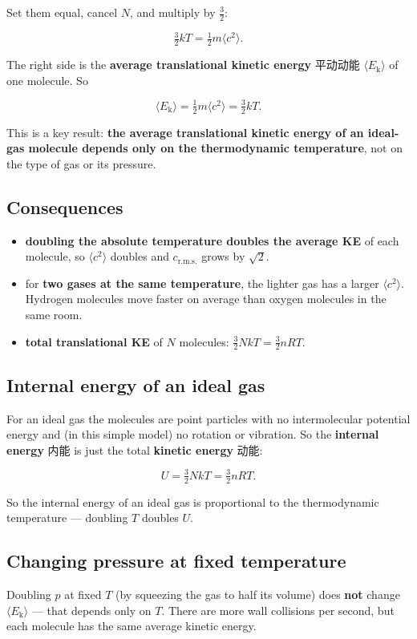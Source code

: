 \documentclass[11pt]{article}
\begin{document}
Set them equal, cancel $N$, and multiply by $\tfrac{3}{2}$:

\[
\tfrac{3}{2} k T = \tfrac{1}{2} m \langle c^{2} \rangle.
\]

The right side is the \textbf{average translational kinetic energy} 平动动能 $\langle E_{\text{k}} \rangle$ of one molecule. So

\[
\langle E_{\text{k}} \rangle = \tfrac{1}{2} m \langle c^{2} \rangle = \tfrac{3}{2} k T.
\]

This is a key result: \textbf{the average translational kinetic energy of an ideal-gas molecule depends only on the thermodynamic temperature}, not on the type of gas or its pressure.

\subsection*{Consequences}

\begin{itemize}
\item \textbf{doubling the absolute temperature doubles the average KE} of each molecule, so $\langle c^{2} \rangle$ doubles and $c_{\text{r.m.s.}}$ grows by $\sqrt{2}$.

\item for \textbf{two gases at the same temperature}, the lighter gas has a larger $\langle c^{2} \rangle$. Hydrogen molecules move faster on average than oxygen molecules in the same room.

\item \textbf{total translational KE} of $N$ molecules: $\tfrac{3}{2} N k T = \tfrac{3}{2} n R T$.

\end{itemize}

\subsection*{Internal energy of an ideal gas}

For an ideal gas the molecules are point particles with no intermolecular potential energy and (in this simple model) no rotation or vibration. So the \textbf{internal energy} 内能 is just the total \textbf{kinetic energy} 动能:

\[
U = \tfrac{3}{2} N k T = \tfrac{3}{2} n R T.
\]

So the internal energy of an ideal gas is proportional to the thermodynamic temperature — doubling $T$ doubles $U$.

\subsection*{Changing pressure at fixed temperature}

Doubling $p$ at fixed $T$ (by squeezing the gas to half its volume) does \textbf{not} change $\langle E_{\text{k}} \rangle$ — that depends only on $T$. There are more wall collisions per second, but each molecule has the same average kinetic energy.
\end{document}
